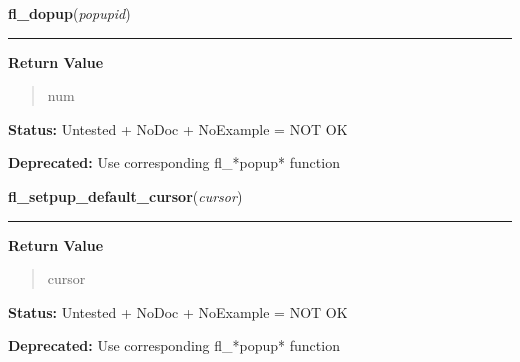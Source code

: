     \label{xformslib:library:fl_dopup}

    \vspace{0.5ex}

\hspace{.8\funcindent}\begin{boxedminipage}{\funcwidth}

    \raggedright \textbf{fl\_dopup}(\textit{popupid})

    \vspace{-1.5ex}

    \rule{\textwidth}{0.5\fboxrule}
\setlength{\parskip}{2ex}
\setlength{\parskip}{1ex}
      \textbf{Return Value}
    \vspace{-1ex}

      \begin{quote}
      num

      \end{quote}

\textbf{Status:} Untested + NoDoc + NoExample = NOT OK



\textbf{Deprecated:} Use corresponding fl\_*popup* function



    \end{boxedminipage}

    \label{xformslib:library:fl_setpup_default_cursor}

    \vspace{0.5ex}

\hspace{.8\funcindent}\begin{boxedminipage}{\funcwidth}

    \raggedright \textbf{fl\_setpup\_default\_cursor}(\textit{cursor})

    \vspace{-1.5ex}

    \rule{\textwidth}{0.5\fboxrule}
\setlength{\parskip}{2ex}
\setlength{\parskip}{1ex}
      \textbf{Return Value}
    \vspace{-1ex}

      \begin{quote}
      cursor

      \end{quote}

\textbf{Status:} Untested + NoDoc + NoExample = NOT OK



\textbf{Deprecated:} Use corresponding fl\_*popup* function



    \end{boxedminipage}

